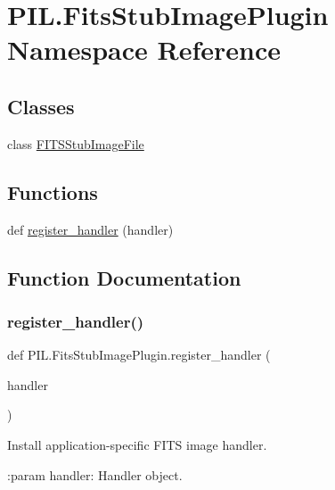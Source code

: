 \hypertarget{namespacePIL_1_1FitsStubImagePlugin}{}\section{P\+I\+L.\+Fits\+Stub\+Image\+Plugin Namespace Reference}
\label{namespacePIL_1_1FitsStubImagePlugin}
\subsection*{Classes}
\begin{DoxyCompactItemize}
\item 
class \hyperlink{classPIL_1_1FitsStubImagePlugin_1_1FITSStubImageFile}{F\+I\+T\+S\+Stub\+Image\+File}
\end{DoxyCompactItemize}
\subsection*{Functions}
\begin{DoxyCompactItemize}
\item 
def \hyperlink{namespacePIL_1_1FitsStubImagePlugin_af2ef12b1070df85ff925d8532ed3e39f}{register\+\_\+handler} (handler)
\end{DoxyCompactItemize}


\subsection{Function Documentation}
\mbox{\label{namespacePIL_1_1FitsStubImagePlugin_af2ef12b1070df85ff925d8532ed3e39f}} 
\subsubsection{\texorpdfstring{register\+\_\+handler()}{register\_handler()}}
{\footnotesize\ttfamily def P\+I\+L.\+Fits\+Stub\+Image\+Plugin.\+register\+\_\+handler (\begin{DoxyParamCaption}\item[{}]{handler }\end{DoxyParamCaption})}

\begin{DoxyVerb}Install application-specific FITS image handler.

:param handler: Handler object.
\end{DoxyVerb}
 